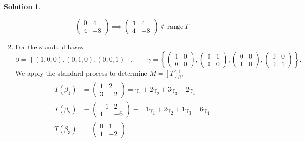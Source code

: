 \documentclass[10pt]{article}
\theoremstyle{definition}
\newtheorem{soln}{Solution}
\begin{document}
\begin{soln}
\begin{enumerate}[label=(\alph*)]
$$            \begin{pmatrix}
              0 & 4  \\
              4 & -8
            \end{pmatrix}\implies \begin{pmatrix}
              \mathbf{1} & 4  \\
              4          & -8
            \end{pmatrix}\notin \text{range}\,T$$
    \item For the standard bases
          $$\beta = \left\{(1,0,0),(0,1,0),(0,0,1)\right\},\qquad
            \gamma=\left\{
            \begin{pmatrix}
              1 & 0 \\
              0 & 0
            \end{pmatrix},
            \begin{pmatrix}
              0 & 1 \\
              0 & 0
            \end{pmatrix},
            \begin{pmatrix}
              0 & 0 \\
              1 & 0
            \end{pmatrix},
            \begin{pmatrix}
              0 & 0 \\
              0 & 1
            \end{pmatrix}
            \right\}.$$
          We apply the standard process to determine $M=\left[T\right]_\beta^\gamma$,
          \begin{align*}
            T(\beta_1) & =\begin{pmatrix}
                            1 & 2  \\
                            3 & -2
                          \end{pmatrix}=\gamma_1+2\gamma_2+3\gamma_3-2\gamma_4   \\
            T(\beta_2) & =\begin{pmatrix}
                            -1 & 2  \\
                            1  & -6
                          \end{pmatrix}=-1\gamma_1+2\gamma_2+1\gamma_3-6\gamma_4 \\
            T(\beta_3) & =\begin{pmatrix}
                            0 & 1  \\
                            1 & -2

\end{pmatrix}
\end{align*}
\end{enumerate}
\end{soln}
\end{document}
